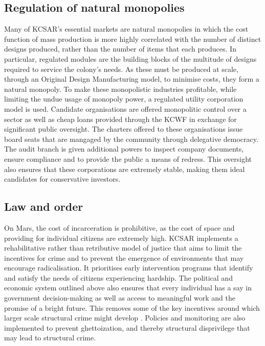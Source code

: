 \documentclass[fleqn,10pt]{Stylesheet} %
\begin{document}
\subsection{Regulation of natural monopolies}
Many of KCSAR's essential markets are natural monopolies in which the cost function of mass production is more highly correlated with the number of distinct designs produced, rather than the number of items that each produces. In particular, regulated modules are the building blocks of the multitude of designs required to service the colony's needs. As these must be produced at scale, through an Original Design Manufacturing model, to minimise costs, they form a natural monopoly. To make these monopolistic industries profitable, while limiting the undue usage of monopoly power, a regulated utility corporation model is used. Candidate organisations are offered monopolitic control over a sector as well as cheap loans provided through the KCWF in exchange for significant public oversight. The charters offered to these organisations issue board seats that are mangaged by the community through delegative democracy. The audit branch is given additional powers to inspect company documents, ensure compliance and to provide the public a means of redress. This oversight also ensures that these corporations are extremely stable, making them ideal candidates for conservative investors.

\subsection{Law and order}
On Mars, the cost of incarceration is prohibitive, as the cost of space and providing for individual citizens are extremely high. KCSAR implements a rehabilitative rather than retributive model of justice that aims to limit the incentives for crime and to prevent the emergence of environments that may encourage radicalisation. It prioritises early intervention programs that identify and satisfy the needs of citizens experiencing hardship. The political and economic system outlined above also ensures that every individual has a say in government decision-making as well as access to meaningful work and the promise of a bright future. This removes some of the key incentives around which larger scale structural crime might develop \cite{10.1093/bjc/azq067}. Policies and monitoring are also implemented to prevent ghettoization, and thereby structural disprivilege that may lead to structural crime. 
\end{document}
